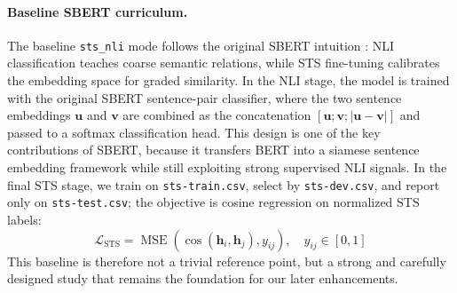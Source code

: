 \documentclass[letterpaper]{article} %
\begin{document}
\paragraph{Baseline SBERT curriculum.}
The baseline \texttt{sts\_nli} mode follows the original SBERT intuition
\cite{reimers-gurevych-2019-sentence-bert}: NLI classification teaches coarse semantic relations,
while STS fine-tuning calibrates the embedding space for graded similarity. In the NLI stage, the
model is trained with the original SBERT sentence-pair classifier, where the two sentence embeddings
$\mathbf{u}$ and $\mathbf{v}$ are combined as the concatenation
$[\mathbf{u};\mathbf{v};|\mathbf{u}-\mathbf{v}|]$ and passed to a softmax classification head. This
design is one of the key contributions of SBERT, because it transfers BERT into a siamese sentence
embedding framework while still exploiting strong supervised NLI signals. In the final STS stage, we
train on \texttt{sts-train.csv}, select by \texttt{sts-dev.csv}, and report only on
\texttt{sts-test.csv}; the objective is cosine regression on normalized STS labels:
\begin{equation}
\mathcal{L}_{\text{STS}}=\operatorname{MSE}\left(\cos(\mathbf{h}_i,\mathbf{h}_j), y_{ij}\right), \quad y_{ij}\in[0,1]
\end{equation}
This baseline is therefore not a trivial reference point, but a strong and carefully designed study
that remains the foundation for our later enhancements.
\end{document}
